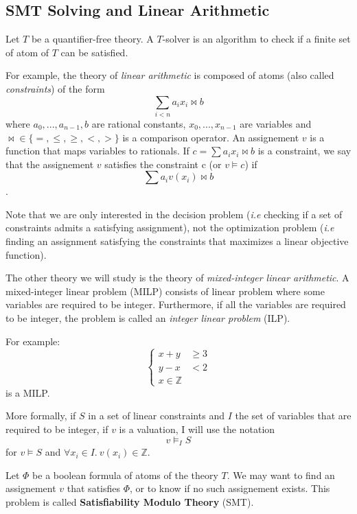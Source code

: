 \documentclass{article}
\newcommand{\ints}{\mathbb{Z}}
\begin{document}
\subsection{SMT Solving and Linear Arithmetic}
\label{smt}
Let $T$ be a quantifier-free theory. A $T$-solver is an algorithm to check if a
finite set of atom of $T$ can be satisfied.

For example, the theory of \textit{linear arithmetic} is composed of atoms (also
called \textit{constraints}) of the form
$$\sum_{i < n} a_i x_i \bowtie b$$
where $a_0, ..., a_{n-1}, b$ are rational constants, $x_0, ..., x_{n-1}$ are
variables and $\bowtie \in \{=,\leqslant,\geqslant,<,>\}$ is a comparison
operator. An assignement $v$ is a function that maps variables to rationals.
If $c = \sum a_i x_i \bowtie b$ is a constraint,  we say that the assignement
$v$ satisfies the constraint c (or $v \vDash c$) if
$$\sum a_i v(x_i) \bowtie b$$.

Note that we are only interested in the decision problem (\textit{i.e} checking
if a set of constraints admits a satisfying assignment), not the optimization
problem (\textit{i.e} finding an assignment satisfying the constraints that
maximizes a linear objective function). 

The other theory we will study is the theory of \textit{mixed-integer linear
arithmetic}. A mixed-integer linear problem (MILP)
consists of linear problem where some variables are
required to be integer. Furthermore, if all the variables are required to be
integer, the problem is called an \textit{integer linear problem} (ILP).

For example:
\begin{displaymath}
  \left\{
  \begin{array}{cc}
    x + y & \geqslant 3 \\
    y - x & < 2 \\
    x \in \ints
  \end{array}
  \right.
\end{displaymath}
is a MILP.

More formally, if $S$ in a set of linear constraints and $I$ the set of
variables that are required to be integer, if $v$ is a valuation, I will use the
notation $$v \vDash_I S$$ for $v \vDash S$ and
$\forall x_i \in I.~v(x_i) \in \ints$.

Let $\Phi$ be a boolean formula of atoms of the theory $T$. We may want to find
an assignement $v$ that satisfies $\Phi$, or to know if no such assignement
exists. This problem is called \textbf{Satisfiability Modulo Theory} (SMT).
\end{document}
